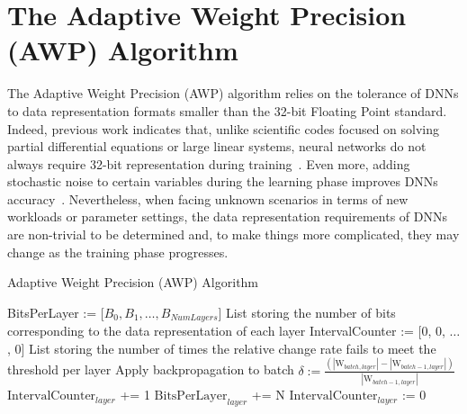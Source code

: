 \section{The Adaptive Weight Precision (AWP) Algorithm}
\label{sec:adaptive}

The Adaptive Weight Precision (AWP) algorithm relies on the tolerance of DNNs to data representation formats smaller than the 32-bit Floating Point standard.
Indeed, previous work indicates that,
unlike scientific codes focused on solving partial differential equations or large linear systems,
neural networks do not always require 32-bit representation during training~\cite{bottou08, gupta15}. 
Even more, adding stochastic noise to certain variables during the learning phase
improves DNNs accuracy~\cite{murray94, bishop95, aud13}.
Nevertheless, when facing unknown scenarios in terms of new workloads or parameter settings,
the data representation requirements of DNNs 
are non-trivial to be determined and, to make things more complicated, they may change as the training phase progresses.

\begin{algorithm}%
\caption{Adaptive Weight Precision (AWP) Algorithm}
\label{alg:norm}
{\fontsize{8}{8}\selectfont
\begin{algorithmic}[1]
    \State BitsPerLayer := [$B_0, B_1, \hdots, B_{NumLayers}$]
    \Comment List storing the number of bits corresponding to the data representation of each layer
    \State IntervalCounter := [0, 0, $\hdots$, 0]
    \Comment List storing the number of times the relative change rate
             fails to meet the threshold per layer
        \State Apply backpropagation to batch
            \State $\delta := \frac{(|\text{W}_{batch, layer}| - |\text{W}_{batch-1, layer}|)}{|\text{W}_{batch-1, layer}|}$
                \State $\text{IntervalCounter}_{layer}$ +=  1
            \EndIf
                \State $\text{BitsPerLayer}_{layer}$ += N
                \State $\text{IntervalCounter}_{layer}$ := 0
            \EndIf
        \EndFor
        \EndFor
\end{algorithmic}
}
\end{algorithm}

